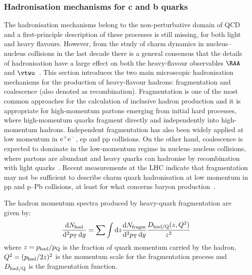\subsubsection{Hadronisation mechanisms for c and b quarks}
\label{sec:HFhadro1}


The hadronisation mechanisms belong to the non-perturbative domain of QCD and a
first-principle description of these processes is still missing, for both light and heavy flavours.
However, from the study of charm dynamics in nucleus--nucleus collisions in the last decade
there is a general consensus that the details of hadronisation have a large effect on both the heavy-flavour observables 
$\RAA$ and $\vtwo$~\cite{Dong:2018ntm,Rapp:2018qla,Scardina:2017ipo}.
This section introduces 
the two main microscopic hadronisation mechanisms for the production of heavy-flavour hadrons: fragmentation and coalescence (also denoted as recombination).
Fragmentation is one of the most common approaches for the calculation of inclusive hadron production and it is appropriate
for high-momentum partons emerging
from initial hard processes, where high-momentum quarks fragment directly and independently into high-momentum hadrons. Independent fragmentation has also been widely applied at low momentum in $\rm e^+e^-$, ep and pp collisions.
On the other hand, coalescence is expected to dominate in the low-momentum regime in nucleus--nucleus collisions, where partons are abundant and heavy quarks
can hadronise by recombination with light quarks~\cite{PhysRevC.68.044901,GRECO2004202,Fries:2008hs}. Recent measurements at the LHC indicate that fragmentation may not be sufficient to 
describe charm quark hadronisation at low momentum in pp and p--Pb collisions, at least
for what concerns baryon production~\cite{Acharya:2017kfy,Acharya:2017lwf}.

The hadron momentum spectra produced by heavy-quark fragmentation are given by:
\begin{equation}
\frac{{\rm d}N_{\rm had}}{{\rm d}^{2}p\sb{\scriptstyle\mathrm{T}}\,{\rm d} y}=\sum \int {\rm d} z \frac{{\rm d} N_{\rm fragm}}{{\rm d}^{2}p\sb{\scriptstyle\mathrm{T}}\, {\rm d} y} \frac{D_{\rm had/Q}(z,Q^{2})}{z^{2}} 
\label{Eq:frag}
\end{equation}
where $z=p_{\rm had}/p_{\rm Q}$ is the fraction of quark momentum carried by the hadron, $Q^2=(p_{\rm had}/2 z)^2$ 
is the momentum scale for the fragmentation process and $D_{\rm had/Q}$ is the fragmentation function. 

